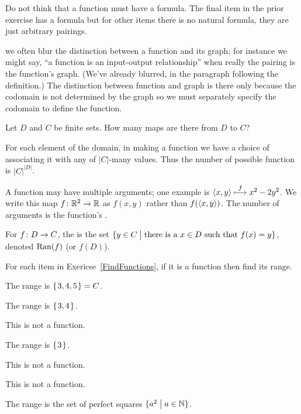 \documentclass{ibl}  %
\begin{document}
Do not think that a function must have a formula.
The final item in the prior exercise has a formula but for other items 
there is no natural formula, they are just arbitrary pairings.

\remark we often blur the distinction between a function and its graph;
for instance we might say, ``a function is an input-output relationship'' 
when really the pairing is the function's graph.
(We've already blurred, in the paragraph following the definition.)
The distinction between function and graph
is there only because the codomain is not determined
by the graph so we must separately specify the codomain to define the function.

\begin{ex}
Let $D$ and $C$ be finite sets.
How many maps are there from $D$ to $C$?
\begin{ans}
For each element of the domain, in making a function we have a choice 
of associating it with any of $|C|$-many values.
Thus the number of possible function is $|C|^{|D|}$.
\end{ans}
\end{ex}

A function may have multiple arguments; one example is 
$\langle x,y\rangle\stackrel{f}{\longmapsto}x^2-2y^2$.
We write this map $\mbox{$f\colon \mathbb{R}^2\to \mathbb{R}$}$ as 
$f(x,y)$ rather than
$f(\langle x,y\rangle)$.
The number of arguments is the function's .

\begin{df}
For $\mbox{$f\colon D\to C$}$,
the  is the set
$\{y\in C \bigm| \text{there is a $x\in D$ such that $f(x)=y$}\}$,
denoted $\operatorname{Ran}(f)$ (or $f(D)$).
\end{df}

\begin{ex}
For each item in Exericse~\ref{FindFunctions}, 
if it is a function then find its range.  
\begin{ans}
\begin{items}
\item The range is $\mbox{$\{\hspace{0.1em}3,4,5\hspace{0.1em}\}$}=C$.    
\item The range is $\mbox{$\{\hspace{0.1em}3,4\hspace{0.1em}\}$}$.
\item This is not a function.   
\item The range is $\mbox{$\{\hspace{0.1em}3\hspace{0.1em}\}$}$.
\item This is not a function.   
\item This is not a function.   
\item The range is the set of perfect squares $\{a^2 \bigm| a\in\mathbb{N}\}$.   
\end{items}
\end{ans}
\end{ex}
\end{document}
